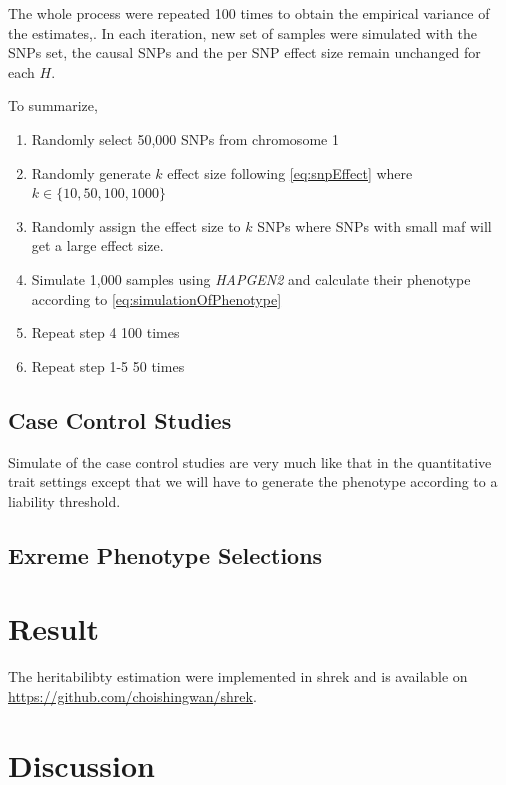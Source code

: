 			The whole process were repeated 100 times to obtain the empirical variance of the estimates,.
			In each iteration, new set of samples were simulated with the \glspl{SNP} set, the causal \glspl{SNP} and the per \gls{SNP} effect size remain unchanged for each $H$.
			
			To summarize, 
			\begin{enumerate}
				\item Randomly select 50,000 \glspl{SNP} from chromosome 1
				\item Randomly generate $k$ effect size following \cref{eq:snpEffect} where $k \in \{10,50,100,1000\}$
				\item Randomly assign the effect size to $k$ \glspl{SNP} where \glspl{SNP} with small \gls{maf} will get a large effect size.
				\item Simulate 1,000 samples using \textit{HAPGEN2} and calculate their phenotype according to \cref{eq:simulationOfPhenotype}
				\item Repeat step 4 100 times
				\item Repeat step 1-5 50 times
			\end{enumerate}
			
			
		\subsection{Case Control Studies}
		Simulate of the case control studies are very much like that in the quantitative trait settings except that we will have to generate the phenotype according to a liability threshold.
		
		\subsection{Exreme Phenotype Selections}
	\section{Result}
		The heritabilibty estimation were implemented in \gls{shrek} and is available on \url{https://github.com/choishingwan/shrek}.
		
	\section{Discussion}